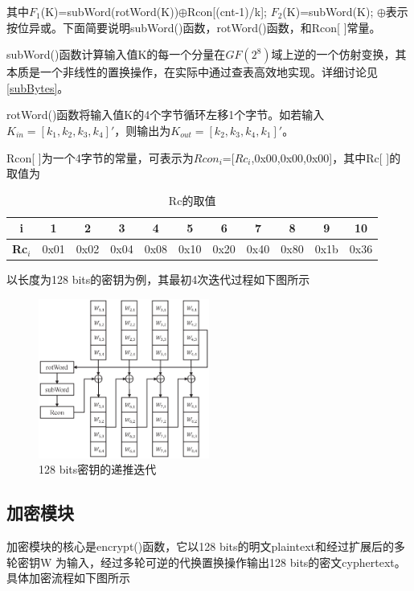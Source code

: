 其中$F_1$(K)=subWord(rotWord(K))$\oplus$Rcon[(cnt-1)/k]; $F_2$(K)=subWord(K); $\oplus$表示按位异或。下面简要说明subWord()函数，rotWord()函数，和Rcon[ ]常量。

subWord()函数计算输入值K的每一个分量在$GF(2^8)$域上逆的一个仿射变换，其本质是一个非线性的置换操作，在实际中通过查表高效地实现。详细讨论见\ref{subBytes}。

rotWord()函数将输入值K的4个字节循环左移1个字节。如若输入$K_{in}=[k_1,k_2,k_3,k_4]'$，则输出为$K_{out}=[k_2,k_3,k_4,k_1]'$。

Rcon[ ]为一个4字节的常量，可表示为$Rcon_i$=[$Rc_i$,0x00,0x00,0x00]，其中Rc[ ]的取值为

\begin{table}[h]
    \centering
    \begin{tabular}{|c|c|c|c|c|c|c|c|c|c|c|}
        \hline
        \textbf{i} & 1 & 2 & 3 & 4 & 5 & 6 & 7 & 8 & 9 & 10 \\
        \hline
        \textbf{Rc$_i$} & 0x01 & 0x02 & 0x04 & 0x08 & 0x10 & 0x20 & 0x40 & 0x80 & 0x1b & 0x36 \\
        \hline
    \end{tabular}
    \caption{Rc的取值}
\end{table}

以长度为128 bits的密钥为例，其最初4次迭代过程如下图所示

\begin{figure}[h]
    \centering
    \includegraphics[width=0.5\textwidth]{./pic/keyExpansion_2.eps}
    \caption{128 bits密钥的递推迭代}
\end{figure}

\subsection{加密模块}

加密模块的核心是encrypt()函数，它以128 bits的明文plaintext和经过扩展后的多轮密钥W 为输入，经过多轮可逆的代换置换操作输出128 bits的密文cyphertext。具体加密流程如下图所示

